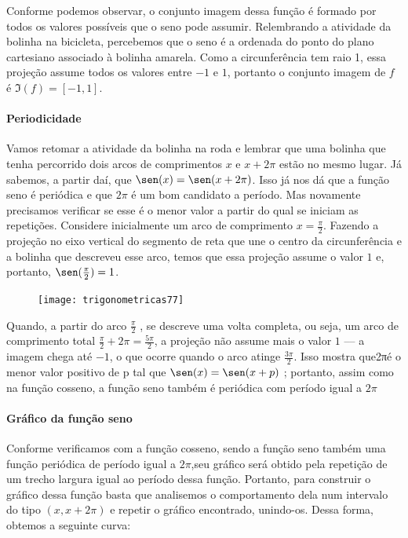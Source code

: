 Conforme podemos observar, o conjunto imagem dessa função é formado por todos os valores possíveis que o seno pode assumir. Relembrando a atividade da bolinha na bicicleta, percebemos que o seno é a ordenada do ponto do plano cartesiano associado à bolinha amarela. Como a circunferência tem raio 1, essa projeção assume todos os valores entre $-1$ e $1$, portanto o conjunto imagem de $f$ é  $\Im(f)=[-1,1]$.

\paragraph{Periodicidade}

Vamos retomar a atividade da bolinha na roda e lembrar que uma bolinha que tenha percorrido dois arcos de comprimentos $x$ e $x+2\pi$ estão no mesmo lugar. Já sabemos, a partir daí, que $\sen(x)=\sen(x+2\pi)$. Isso já nos dá que a função seno é periódica e que $2\pi$ é um bom candidato a período. Mas novamente precisamos verificar se esse é o menor valor a partir do qual se iniciam as repetições. Considere inicialmente um arco de comprimento $x=\frac{\pi}{2}$. Fazendo a projeção no eixo vertical do segmento de reta que une o centro da circunferência e a bolinha que descreveu esse arco, temos que essa projeção assume o valor $1$ e, portanto, $\sen(\frac{\pi}{2})=1$.

\begin{figure}[H]
\centering

\texttt{[image: trigonometricas77]}
\end{figure}

Quando, a partir do arco $\frac{\pi}{2}$ , se descreve uma volta completa, ou seja, um arco de comprimento total  $\frac{\pi}{2}+2\pi=\frac{5\pi}{2}$, a projeção não assume mais o valor $1$ --– a imagem chega até $-1$, o que ocorre quando o arco atinge $\frac{3\pi}{2}$. Isso mostra que2πé o menor valor positivo de p tal que $\sen(x)=\sen(x+p)$ ; portanto, assim como na função cosseno, a função seno também é periódica com período igual a $2\pi$

\paragraph{Gráfico da função seno}

Conforme verificamos com a função cosseno, sendo a função seno também uma função periódica de período igual a $2\pi$,seu gráfico será obtido pela repetição de um trecho largura igual ao período dessa função. Portanto, para construir o gráfico dessa função basta que analisemos o comportamento dela num intervalo do tipo $(x, x+2π)$ e repetir o gráfico encontrado, unindo-os. Dessa forma, obtemos a seguinte curva:

